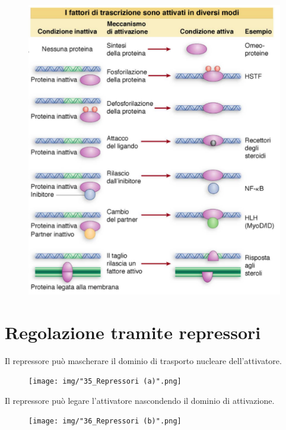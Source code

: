 \documentclass[11pt]{book}
\begin{document}
\begin{figure}[htp]
\centering
\includegraphics[scale=1.00]{img/34_attivatori.png}
\caption{}
\label{attivatori}
\end{figure}

\section{Regolazione tramite
repressori}\label{regolazione-tramite-repressori}

Il repressore può mascherare il dominio di trasporto nucleare
dell'attivatore.

\begin{figure}[htp]
\centering
\texttt{[image: img/"35\_Repressori (a)".png]}
\caption{}
\label{repressori-a}
\end{figure}

Il repressore può legare l'attivatore nascondendo il dominio di
attivazione.

\begin{figure}[htp]
\centering
\texttt{[image: img/"36\_Repressori (b)".png]}
\caption{}
\label{repressori-b}
\end{figure}
\end{document}
